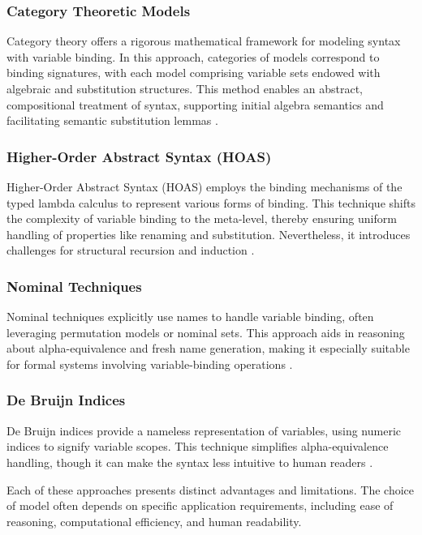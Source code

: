 \documentclass{article}
\begin{document}
\subsubsection{Category Theoretic Models}
Category theory offers a rigorous mathematical framework for modeling syntax
with variable binding. In this approach, categories of models correspond to
binding signatures, with each model comprising variable sets endowed with
algebraic and substitution structures. This method enables an abstract,
compositional treatment of syntax, supporting initial algebra semantics and
facilitating semantic substitution lemmas \cite{fiore99cat}.

\subsubsection{Higher-Order Abstract Syntax (HOAS)}
Higher-Order Abstract Syntax (HOAS) employs the binding mechanisms of the typed
lambda calculus to represent various forms of binding. This technique shifts the
complexity of variable binding to the meta-level, thereby ensuring uniform
handling of properties like renaming and substitution. Nevertheless, it
introduces challenges for structural recursion and induction \cite{gabbay02hoas}.

\subsubsection{Nominal Techniques}
Nominal techniques explicitly use names to handle variable binding, often
leveraging permutation models or nominal sets. This approach aids in reasoning
about alpha-equivalence and fresh name generation, making it especially suitable
for formal systems involving variable-binding operations \cite{pitts16nominal}.

\subsubsection{De Bruijn Indices}
De Bruijn indices provide a nameless representation of variables, using numeric
indices to signify variable scopes. This technique simplifies alpha-equivalence
handling, though it can make the syntax less intuitive to human readers
\cite{bruijn72lambda}.

Each of these approaches presents distinct advantages and limitations. The
choice of model often depends on specific application requirements, including
ease of reasoning, computational efficiency, and human readability.
\end{document}
